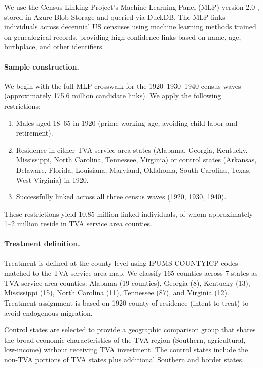 \documentclass[12pt]{article}
\begin{document}
We use the Census Linking Project's Machine Learning Panel (MLP) version 2.0 \citep{price2021mlp, abramitzky2019automated}, stored in Azure Blob Storage and queried via DuckDB. The MLP links individuals across decennial US censuses using machine learning methods trained on genealogical records, providing high-confidence links based on name, age, birthplace, and other identifiers.

\paragraph{Sample construction.} We begin with the full MLP crosswalk for the 1920--1930--1940 census waves (approximately 175.6 million candidate links). We apply the following restrictions:
\begin{enumerate}
\item Males aged 18--65 in 1920 (prime working age, avoiding child labor and retirement).
\item Residence in either TVA service area states (Alabama, Georgia, Kentucky, Mississippi, North Carolina, Tennessee, Virginia) or control states (Arkansas, Delaware, Florida, Louisiana, Maryland, Oklahoma, South Carolina, Texas, West Virginia) in 1920.
\item Successfully linked across all three census waves (1920, 1930, 1940).
\end{enumerate}
These restrictions yield 10.85 million linked individuals, of whom approximately 1--2 million reside in TVA service area counties.

\paragraph{Treatment definition.} Treatment is defined at the county level using IPUMS COUNTYICP codes matched to the TVA service area map. We classify 165 counties across 7 states as TVA service area counties: Alabama (19 counties), Georgia (8), Kentucky (13), Mississippi (15), North Carolina (11), Tennessee (87), and Virginia (12). Treatment assignment is based on 1920 county of residence (intent-to-treat) to avoid endogenous migration.

Control states are selected to provide a geographic comparison group that shares the broad economic characteristics of the TVA region (Southern, agricultural, low-income) without receiving TVA investment. The control states include the non-TVA portions of TVA states plus additional Southern and border states.
\end{document}
